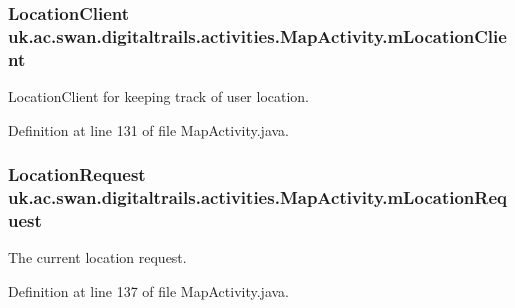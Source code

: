 \hypertarget{classuk_1_1ac_1_1swan_1_1digitaltrails_1_1activities_1_1_map_activity_ad65b4445612c08eb8fe55fde76dc3a01}{
\subsubsection[{m\+Location\+Client}]{\setlength{\rightskip}{0pt plus 5cm}Location\+Client uk.\+ac.\+swan.\+digitaltrails.\+activities.\+Map\+Activity.\+m\+Location\+Client\hspace{0.3cm}{\ttfamily [private]}}}\label{classuk_1_1ac_1_1swan_1_1digitaltrails_1_1activities_1_1_map_activity_ad65b4445612c08eb8fe55fde76dc3a01}


Location\+Client for keeping track of user location. 



Definition at line 131 of file Map\+Activity.\+java.

\hypertarget{classuk_1_1ac_1_1swan_1_1digitaltrails_1_1activities_1_1_map_activity_a277671a16bab76f50d1fe79d675f4128}{
\subsubsection[{m\+Location\+Request}]{\setlength{\rightskip}{0pt plus 5cm}Location\+Request uk.\+ac.\+swan.\+digitaltrails.\+activities.\+Map\+Activity.\+m\+Location\+Request\hspace{0.3cm}{\ttfamily [private]}}}\label{classuk_1_1ac_1_1swan_1_1digitaltrails_1_1activities_1_1_map_activity_a277671a16bab76f50d1fe79d675f4128}


The current location request. 



Definition at line 137 of file Map\+Activity.\+java.

